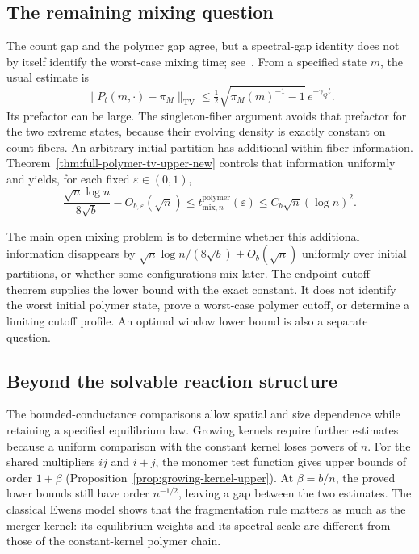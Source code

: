 \subsection{The remaining mixing question}

The count gap and the polymer gap agree, but a spectral-gap
identity does not by itself identify the worst-case mixing time;
see~\cite{LevinPeres2017}. From a specified state $m$, the usual
estimate is
\[
 \|P_t(m,\cdot)-\pi_M\|_{\mathrm{TV}}
 \le\tfrac12\sqrt{\pi_M(m)^{-1}-1}\,e^{-\gamma_Qt}.
\]
Its prefactor can be large. The singleton-fiber argument avoids
that prefactor for the two extreme states, because their evolving
density is exactly constant on count fibers. An arbitrary initial
partition has additional within-fiber information.
Theorem~\ref{thm:full-polymer-tv-upper-new} controls that information
uniformly and yields, for each fixed $\varepsilon\in(0,1)$,
\[
 \frac{\sqrt n\log n}{8\sqrt b}-O_{b,\varepsilon}(\sqrt n)
 \le t^{\mathrm{polymer}}_{\mathrm{mix},n}(\varepsilon)
 \le C_b\sqrt n(\log n)^2.
\]

The main open mixing problem is to determine whether this
additional information disappears by
$\sqrt n\log n/(8\sqrt b)+O_b(\sqrt n)$ uniformly over initial
partitions, or whether some configurations mix later. The
endpoint cutoff theorem supplies the lower bound with the exact
constant. It does not identify the worst initial polymer state,
prove a worst-case polymer cutoff, or determine a limiting cutoff
profile. An optimal window lower bound is also a separate question.

\subsection{Beyond the solvable reaction structure}

The bounded-conductance comparisons allow spatial and size
dependence while retaining a specified equilibrium law. Growing
kernels require further estimates because a uniform comparison
with the constant kernel loses powers of $n$.
For the shared multipliers $ij$ and $i+j$, the monomer test function
gives upper bounds of order $1+\beta$
(Proposition~\ref{prop:growing-kernel-upper}). At $\beta=b/n$, the
proved lower bounds still have order $n^{-1/2}$, leaving a gap between
the two estimates. The classical Ewens
model shows that the fragmentation rule matters as much as the
merger kernel: its equilibrium weights and its spectral scale are
different from those of the constant-kernel polymer chain.


